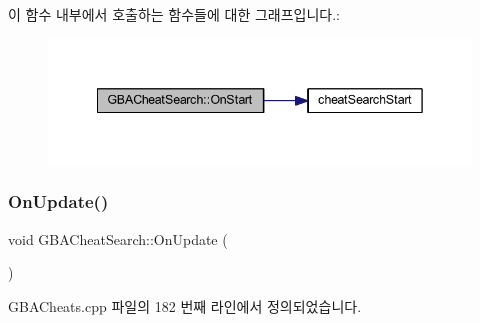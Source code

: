 이 함수 내부에서 호출하는 함수들에 대한 그래프입니다.\+:
\nopagebreak
\begin{figure}[H]
\begin{center}
\leavevmode
\includegraphics[width=342pt]{class_g_b_a_cheat_search_a7c1882cbc31a995d42b02017af188353_cgraph}
\end{center}
\end{figure}
\mbox{\label{class_g_b_a_cheat_search_ac38fa782e7bb20f90f40e6605808f9fe}} 
\subsubsection{\texorpdfstring{On\+Update()}{OnUpdate()}}
{\footnotesize\ttfamily void G\+B\+A\+Cheat\+Search\+::\+On\+Update (\begin{DoxyParamCaption}{ }\end{DoxyParamCaption})\hspace{0.3cm}{\ttfamily [protected]}}



G\+B\+A\+Cheats.\+cpp 파일의 182 번째 라인에서 정의되었습니다.


